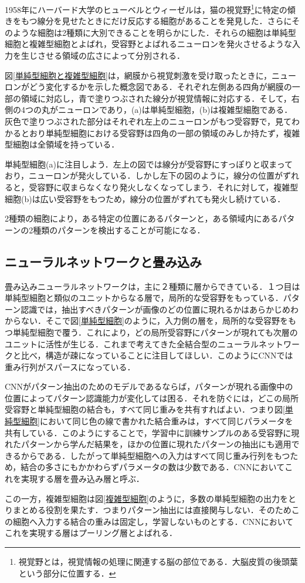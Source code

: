 \documentclass[a4paper,11pt]{jsreport}
\begin{document}
1958年にハーバード大学のヒューベルとウィーゼルは，猫の視覚野\footnote{視覚野とは，視覚情報の処理に関連する脳の部位である．大脳皮質の後頭葉という部分に位置する．}に特定の傾きをもつ線分を見せたときにだけ反応する細胞があることを発見した．さらにそのような細胞は2種類に大別できることを明らかにした．それらの細胞は単純型細胞と複雑型細胞とよばれ，受容野とよばれるニューロンを発火させるような入力を生じさせる領域の広さによって分別される．\par
図\ref{単純型細胞と複雑型細胞}は，網膜から視覚刺激を受け取ったときに，ニューロンがどう変化するかを示した概念図である．それぞれ左側ある四角が網膜の一部の領域に対応し，青で塗りつぶされた線分が視覚情報に対応する．そして，右側の4つの丸がニューロンであり，(a)は単純型細胞，(b)は複雑型細胞である．灰色で塗りつぶされた部分はそれぞれ左上のニューロンがもつ受容野で，見てわかるとおり単純型細胞における受容野は四角の一部の領域のみしか持たず，複雑型細胞は全領域を持っている．\par
単純型細胞(a)に注目しよう．左上の図では線分が受容野にすっぽりと収まっており，ニューロンが発火している．しかし左下の図のように，線分の位置がずれると，受容野に収まらなくなり発火しなくなってしまう．それに対して，複雑型細胞(b)は広い受容野をもつため，線分の位置がずれても発火し続けている．\par
2種類の細胞により，ある特定の位置にあるパターンと，ある領域内にあるパターンの2種類のパターンを検出することが可能になる．

\subsection{ニューラルネットワークと畳み込み}
畳み込みニューラルネットワークは，主に２種類に層からできている．１つ目は単純型細胞と類似のユニットからなる層で，局所的な受容野をもっている．パターン認識では，抽出すべきパターンが画像のどの位置に現れるかはあらかじめわからない．そこで図\ref{単純型細胞}のように，入力側の層を，局所的な受容野をもつ単純型細胞で覆う．これにより，どの局所受容野にパターンが現れても次層のユニットに活性が生じる．これまで考えてきた全結合型のニューラルネットワークと比べ，構造が疎になっていることに注目してほしい．このようにCNNでは重み行列がスパースになっている．\par
CNNがパターン抽出のためのモデルであるならば，パターンが現れる画像中の位置によってパターン認識能力が変化しては困る．それを防ぐには，どこの局所受容野と単純型細胞の結合も，すべて同じ重みを共有すればよい．つまり図\ref{単純型細胞}において同じ色の線で書かれた結合重みは，すべて同じパラメータを共有している．このようにすることで，学習中に訓練サンプルのある受容野に現れたパターンから学んだ結果を，ほかの位置に現れたパターンの抽出にも適用できるからである．したがって単純型細胞への入力はすべて同じ重み行列をもつため，結合の多さにもかかわらずパラメータの数は少数である．CNNにおいてこれを実現する層を畳み込み層と呼ぶ．\par
この一方，複雑型細胞は図\ref{複雑型細胞}のように，多数の単純型細胞の出力をとりまとめる役割を果たす．つまりパターン抽出には直接関与しない．そのためこの細胞へ入力する結合の重みは固定し，学習しないものとする．CNNにおいてこれを実現する層はプーリング層とよばれる．
\end{document}
